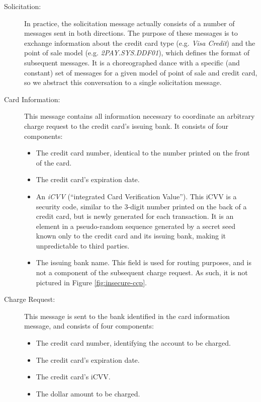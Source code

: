 \begin{description}

\item[Solicitation:]
In practice, the solicitation message actually consists of a number of messages sent in both directions.
The purpose of these messages is to exchange information about the credit card type (e.g. \emph{Visa Credit}) and the point of sale model (e.g. \emph{2PAY.SYS.DDF01}), which defines the format of subsequent messages.
It is a choreographed dance with a specific (and constant) set of messages for a given model of point of sale and credit card, so we abstract this conversation to a single solicitation message.

\item[Card Information:]
This message contains all information necessary to coordinate an arbitrary charge request to the credit card's issuing bank. It consists of four components:
\begin{itemize}
	\item The credit card number, identical to the number printed on the front of the card.
	\item The credit card's expiration date.
	\item An \emph{iCVV} (``integrated Card Verification Value'').
		This iCVV is a security code, similar to the 3-digit number printed on the back of a credit card, but is newly generated for each transaction.
		It is an element in a pseudo-random sequence generated by a secret seed known only to the credit card and its issuing bank, making it unpredictable to third parties.
	\item The issuing bank name.
		This field is used for routing purposes, and is not a component of the subsequent charge request.
		As such, it is not pictured in Figure \ref{fig:insecure-ccp}.
\end{itemize}

\item[Charge Request:]
This message is sent to the bank identified in the card information message, and consists of four components:
\begin{itemize}
	\item The credit card number, identifying the account to be charged.
	\item The credit card's expiration date.
	\item The credit card's iCVV.
	\item The dollar amount to be charged.
\end{itemize}


\end{description}
